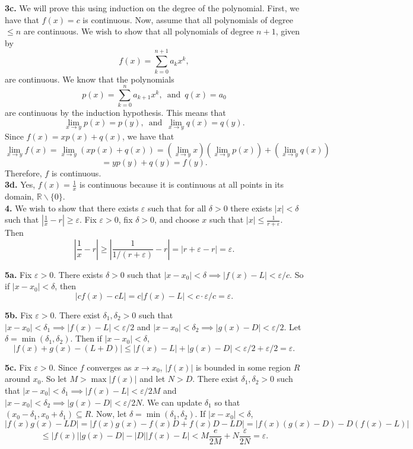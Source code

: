 \documentclass{article}
\newcommand{\R}{\mathbb{R}}
\newcommand{\eps}{\varepsilon}
\begin{document}
\textbf{3c.} We will prove this using induction on the degree of the polynomial. First, we have that $f(x) = c$ is continuous. Now, assume that all polynomials of degree $\le n$ are continuous. We wish to show that all polynomials of degree $n + 1$, given by
$$f(x) = \sum_{k = 0}^{n + 1} a_k x^k,$$
are continuous. We know that the polynomials
$$p(x) = \sum_{k = 0}^n a_{k + 1} x^k,\, \text{ and } \, q(x) = a_0$$
are continuous by the induction hypothesis. This means that
$$\lim_{x \to y} p(x) = p(y),\, \text{ and } \, \lim_{x \to y} q(x) = q(y).$$
Since $f(x) = xp(x) + q(x)$, we have that
$$\lim_{x \to y} f(x) = \lim_{x \to y} (xp(x) + q(x)) = \left(\lim_{x \to y}x\right)\left(\lim_{x\to y} p(x)\right) + \left(\lim_{x\to y} q(x)\right)$$
$$= yp(y) + q(y) = f(y).$$
Therefore, $f$ is continuous. \\

\textbf{3d.} Yes, $f(x) = \frac{1}{x}$ is continuous because it is continuous at all points in its domain, $\R \backslash \{0\}$. \\

\textbf{4.} We wish to show that there exists $\eps$ such that for all $\delta > 0$ there exists $|x| < \delta$ such that $\left|\frac{1}{x} - r\right| \ge \eps$. Fix $\eps > 0$, fix $\delta > 0$, and choose $x$ such that $|x| \le \frac{1}{r + \eps}$. Then
$$\left|\frac{1}{x} - r\right| \ge \left|\frac{1}{1/(r + \eps)} - r\right| = |r + \eps - r| = \eps.$$

\textbf{5a.} Fix $\eps > 0$. There exists $\delta > 0$ such that $|x - x_0| < \delta \implies |f(x) - L| < \eps/c$. So if $|x - x_0| < \delta$, then
$$|cf(x) - cL| = c|f(x) - L| < c\cdot\eps/c = \eps.$$

\textbf{5b.} Fix $\eps > 0$. There exist $\delta_1, \delta_2 > 0$ such that $|x - x_0| < \delta_1 \implies |f(x) - L| < \eps/2$ and $|x - x_0| < \delta_2 \implies |g(x) - D| < \eps/2$. Let $\delta = \min(\delta_1, \delta_2)$. Then if $|x - x_0| < \delta$,
$$|f(x) + g(x) - (L + D)| \le |f(x) - L| + |g(x) - D| < \eps/2 + \eps/2 = \eps.$$

\textbf{5c.} Fix $\eps > 0$. Since $f$ converges as $x \to x_0$, $|f(x)|$ is bounded in some region $R$ around $x_0$. So let $M > \max|f(x)|$ and let $N > D$. There exist $\delta_1, \delta_2 > 0$ such that $|x - x_0| < \delta_1 \implies |f(x) - L| < \eps/2M$ and $|x - x_0| < \delta_2 \implies |g(x) - D| < \eps/2N$. We can update $\delta_1$ so that $(x_0 - \delta_1, x_0 + \delta_1) \subseteq R$. Now, let $\delta = \min(\delta_1, \delta_2).$ If $|x - x_0| < \delta$,
$$|f(x)g(x) - LD| = |f(x)g(x) - f(x)D + f(x)D - LD| = |f(x)(g(x) - D) - D(f(x) - L)|$$
$$\le |f(x)||g(x) - D| - |D||f(x) - L| < M\frac{e}{2M} + N\frac{\eps}{2N} = \eps.$$
\end{document}
